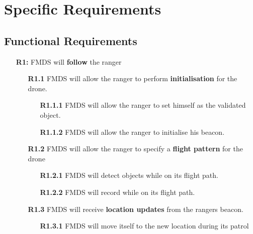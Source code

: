 \chapter{Specific Requirements}

\section{Functional Requirements}
\begin{flushleft}
\begin{itemize}
	\item  [\textbf{R1:}] FMDS will \textbf{follow} the ranger

		\begin{itemize}
			\item  [\textbf{R1.1}] FMDS will allow the ranger to perform \textbf{initialisation} for the drone.
				\begin{itemize}
					\item [\textbf{R1.1.1}] FMDS will allow the ranger to set himself as the validated object.
					\item [\textbf{R1.1.2}] FMDS will allow the ranger to initialise his beacon. 
				\end{itemize}

			\item  [\textbf{R1.2}] FMDS will allow the ranger to specify a \textbf{flight pattern} for the drone
				\begin{itemize}
					\item [\textbf{R1.2.1}] FMDS will detect objects while on its flight path.
					\item [\textbf{R1.2.2}] FMDS will record while on its flight path.
				\end{itemize}

			\item  [\textbf{R1.3}] FMDS will receive \textbf{location updates} from the rangers beacon.
				\begin{itemize}
					\item  [\textbf{R1.3.1}] FMDS will move itself to the new location during its patrol
				\end{itemize}
		\end{itemize}
\end{itemize}


\end{flushleft}
